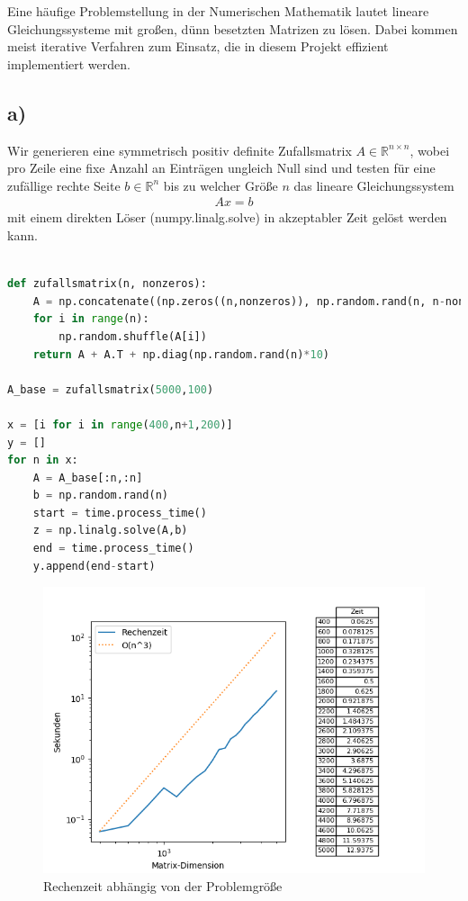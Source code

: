 Eine häufige Problemstellung in der Numerischen Mathematik lautet lineare Gleichungssysteme mit großen, dünn besetzten Matrizen zu lösen.
Dabei kommen meist iterative Verfahren zum Einsatz, die in diesem Projekt effizient implementiert werden.
\subsection*{a)}
Wir generieren eine symmetrisch positiv definite Zufallsmatrix $A \in \mathbb{R}^{n\times n}$, wobei pro Zeile eine fixe Anzahl an Einträgen
ungleich Null sind und testen für eine zufällige rechte Seite $b \in \mathbb{R}^n$ bis zu welcher Größe $n$ das lineare
Gleichungssystem
\begin{align*}
  Ax = b
\end{align*}
mit einem direkten Löser (numpy.linalg.solve) in akzeptabler Zeit gelöst werden kann.
\begin{lstlisting}[language=Python]

def zufallsmatrix(n, nonzeros):
	A = np.concatenate((np.zeros((n,nonzeros)), np.random.rand(n, n-nonzeros)), axis = 1)
	for i in range(n):
		np.random.shuffle(A[i])
	return A + A.T + np.diag(np.random.rand(n)*10)

A_base = zufallsmatrix(5000,100)

x = [i for i in range(400,n+1,200)]
y = []
for n in x:
	A = A_base[:n,:n]
	b = np.random.rand(n)
	start = time.process_time()
	z = np.linalg.solve(A,b)
	end = time.process_time()
	y.append(end-start)
\end{lstlisting}
\begin{figure}
    \centering
    \includegraphics[width=\linewidth]{Aufgabe_1/plot_a.png}
    \caption{Rechenzeit abhängig von der Problemgröße}
    \label{fig:my_label}
\end{figure}

